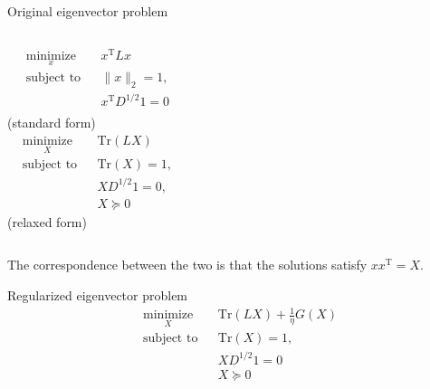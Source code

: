 \documentclass[xcolor=dvipsnames]{beamer}
\begin{document}
\begin{frame}
  \begin{block}{Original eigenvector problem}
  \begin{columns}
    \begin{equation*}
    \begin{aligned}
    & \underset{x}{\text{minimize}}
    & & x^\mathrm{T} L x \\
    & \text{subject to}
    & & \| x \|_2 = 1, \\
    & & & x^\mathrm{T} D^{1/2} 1 = 0 \\
    & & &
    \end{aligned}
    \end{equation*}
    (standard form)
    \begin{equation*}
    \begin{aligned}
    & \underset{X}{\text{minimize}}
    & & \mathrm{Tr}(L X)\\
    & \text{subject to}
    & & \mathrm{Tr}(X) = 1, \\
    & & & X D^{1/2} 1 = 0, \\
    & & & X \succeq 0
    \end{aligned}
    \end{equation*}
    (relaxed form)
  \end{columns}
  \end{block}
  The correspondence between the two is that the solutions satisfy
  $x x^\mathrm{T} = X$.
\end{frame}

\begin{frame}
  \begin{block}{Regularized eigenvector problem}
    \begin{equation*}
    \begin{aligned}
    & \underset{X}{\text{minimize}}
    & & \mathrm{Tr}(L X) + \tfrac{1}{\eta} G(X) \\
    & \text{subject to}
    & & \mathrm{Tr}(X) = 1, \\
    & & & X D^{1/2} 1 = 0 \\
    & & & X \succeq 0
    \end{aligned}
    \end{equation*}
  \end{block}
\end{frame}
\end{document}
